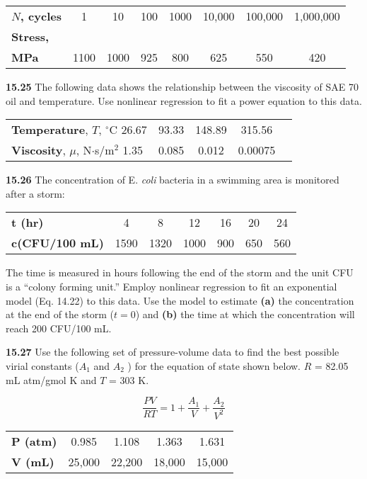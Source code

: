 \documentclass[../main.tex]{subfiles}
\begin{document}
\begin{multicols}{2}
	\noindent
	\begin{tabular}{l c c c c c c c}
		\textbf{$N$, cycles} &1 & 10 &100 &1000& 10,000& 100,000& 1,000,000\\
		\textbf{Stress,} \\
		\textbf{MPa} & 1100 & 1000 & 925 & 800 &	625 &	550 &	420
	\end{tabular}

	\noindent\textbf{15.25} The following data shows the relationship between the viscosity of SAE 70 oil and temperature. Use nonlinear regression to fit a power equation to this data.

	\noindent
	\begin{tabular}{l c c c c}
		\textbf{Temperature}, $T$, $^\circ$C 26.67 & 93.33 & 148.89 & 315.56 \\
		\textbf{Viscosity}, $\mu$, N$\cdot$s/m$^2$ 1.35 & 0.085 & 0.012 & 0.00075
	\end{tabular}

	\noindent\textbf{15.26} The concentration of E. \textit{coli} bacteria in a swimming
	area is monitored after a storm:

	\noindent
	\begin{tabular}{l c c c c c c}
		\textbf{t (hr)} &	4 &	8 &	12 &	16 &	20 &	24 \\
		\textbf{c(CFU/100 mL)} &	1590 &	1320 &	1000 &	900 &	650 &	560	   
	\end{tabular}

	\noindent The time is measured in hours following the end of the storm
and the unit CFU is a ``colony forming unit.'' Employ nonlinear regression to fit an exponential model (Eq. 14.22) to
this data. Use the model to estimate \textbf{(a)} the concentration at
the end of the storm ($t = 0$) and \textbf{(b)} the time at which the
concentration will reach 200 CFU/100 mL.

	\noindent\textbf{15.27} Use the following set of pressure-volume data to
	find the best possible virial constants ($A_1$ and $A_2$ ) for the
	equation of state shown below. $R$ = 82.05 mL atm/gmol K
	and $T$ = 303 K.

	$$
		\frac{PV}{RT} = 1 + \frac{A_1}{V} + \frac{A_2}{V^2}
	$$
   
	\noindent
	\begin{tabular}{l c c c c}
		\textbf{P (atm)} & 0.985 & 1.108 & 1.363 & 1.631 \\
		\textbf{V (mL)} & 25,000 & 22,200 & 18,000 & 15,000
	\end{tabular}


\end{multicols}
\end{document}
